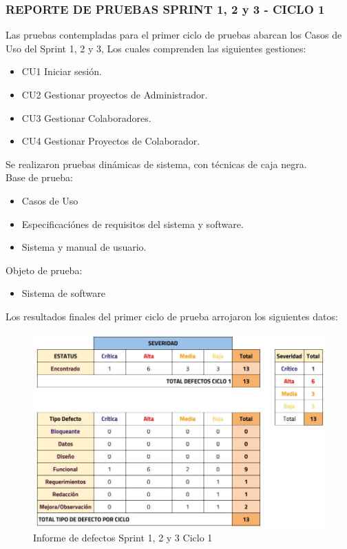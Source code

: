 \subsubsection{REPORTE DE PRUEBAS SPRINT 1, 2 y 3 - CICLO 1}

Las pruebas contempladas para el primer ciclo de pruebas abarcan los Casos de Uso del Sprint 1, 2 y 3, Los cuales comprenden las siguientes gestiones:

\begin{itemize}
	\item CU1 Iniciar sesión.
	\item CU2 Gestionar proyectos de Administrador.
	\item CU3 Gestionar Colaboradores.
	\item CU4 Gestionar Proyectos de Colaborador.
\end{itemize}

Se realizaron pruebas dinámicas de sistema, con técnicas de caja negra.\\

Base de prueba:
\begin{itemize}
	\item Casos de Uso
	\item Especificaciónes de requisitos del sistema y software.
	\item Sistema y manual de usuario.
\end{itemize}

Objeto de prueba:
\begin{itemize}
	\item Sistema de software
\end{itemize}

\newpage

Los resultados finales del primer ciclo de prueba arrojaron los siguientes datos:

\begin{figure}[H]
	\begin{center}
		\includegraphics[width=.95\textwidth]{images/pruebas/s1c1}
		\caption{Informe de defectos Sprint 1, 2 y 3 Ciclo 1}
		\label{fig:infos1c1}
	\end{center}
\end{figure}

